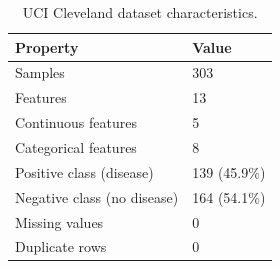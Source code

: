 \begin{table}[t]
\centering
\caption{UCI Cleveland dataset characteristics.}
\label{tab:dataset}
\small
\begin{tabular}{ll}
\toprule
Property & Value \\
\midrule
Samples & 303 \\
Features & 13 \\
Continuous features & 5 \\
Categorical features & 8 \\
Positive class (disease) & 139 (45.9\%) \\
Negative class (no disease) & 164 (54.1\%) \\
Missing values & 0 \\
Duplicate rows & 0 \\
\bottomrule
\end{tabular}
\end{table}
